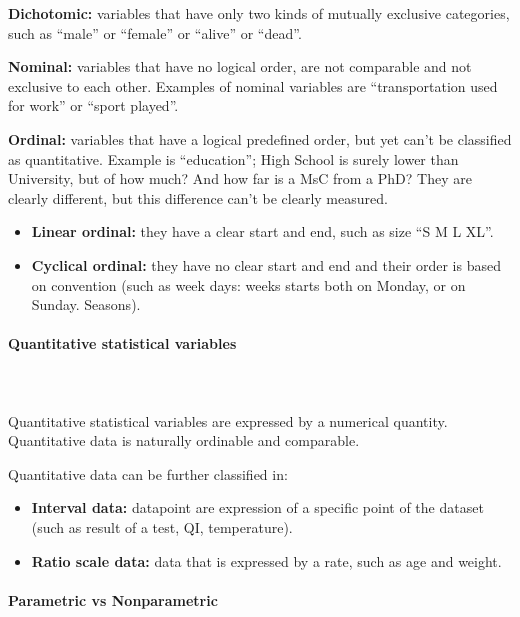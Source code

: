 \documentclass{article}
\begin{document}
\textbf{Dichotomic:} variables that have only two kinds of mutually exclusive categories,  such as “male” or “female” or “alive” or “dead”.

\textbf{Nominal:} variables that have no logical order, are not comparable and not exclusive to each other. Examples of nominal variables are “transportation used for work” or “sport played”.

\textbf{Ordinal:} variables that have a logical predefined order, but yet can’t be classified as quantitative. 
Example is “education”; High School is surely lower than University, but of how much? 
And how far is a MsC from a PhD? They are clearly different, but this difference can’t be clearly measured. 

    \begin{itemize}
        \item \textbf{Linear ordinal:} they have a clear start and end, such as size “S M L XL”.
        \item \textbf{Cyclical ordinal:} they have no clear start and end and their order is based on convention (such as week days: weeks starts both on Monday, or on Sunday. Seasons).
    \end{itemize}

\paragraph{Quantitative statistical variables}\mbox{} \\
\mbox{} \\

Quantitative statistical variables are expressed by a numerical quantity.
Quantitative data is naturally ordinable and comparable. 

Quantitative data can be further classified in: 

    \begin{itemize}
        \item \textbf{Interval data:} datapoint are expression of a specific point of the dataset (such as result of a test, QI, temperature).
        \item \textbf{Ratio scale data:} data that is expressed by a rate, such as age and weight.
    \end{itemize}

\paragraph{Parametric vs Nonparametric}\mbox{} \\
\mbox{} \\
\end{document}
